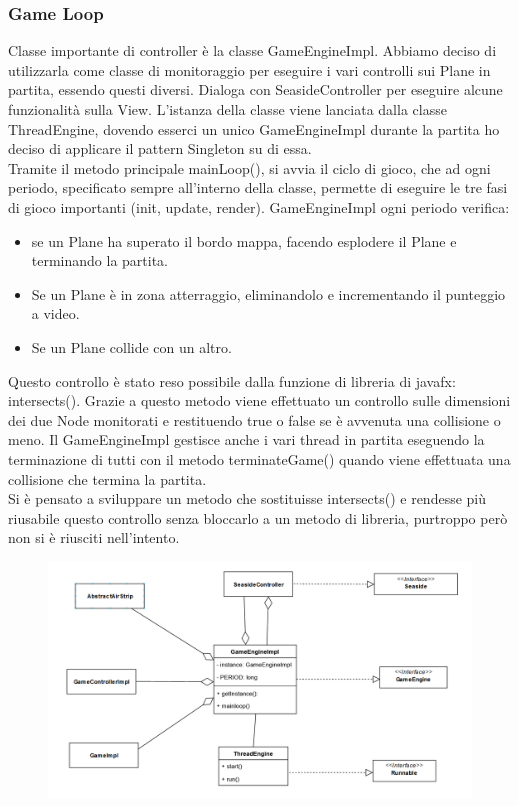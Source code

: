 \documentclass[a4paper,12pt]{report}
\begin{document}
\subsubsection{Game Loop}
Classe importante di controller è la classe GameEngineImpl.
Abbiamo deciso di utilizzarla come classe di monitoraggio per eseguire i vari controlli sui Plane in partita, essendo questi diversi.
Dialoga con SeasideController per eseguire alcune funzionalità sulla View.
L’istanza della classe viene lanciata dalla classe ThreadEngine, dovendo esserci un unico GameEngineImpl durante la partita ho deciso 
di applicare il pattern Singleton su di essa.
\\
Tramite il metodo principale mainLoop(), si avvia il ciclo di gioco, che ad ogni periodo, specificato sempre all’interno della classe, 
permette di eseguire le tre fasi di gioco importanti (init, update, render).
GameEngineImpl ogni periodo verifica:
\begin{itemize}
	\item se un Plane ha superato il bordo mappa, facendo esplodere il Plane e terminando la partita.
	\item Se un Plane è in zona atterraggio, eliminandolo e incrementando il punteggio a video.
	\item Se un Plane collide con un altro.
\end{itemize}

\noindent Questo controllo è stato reso possibile dalla funzione di libreria di javafx: intersects().
Grazie a questo metodo viene effettuato un controllo sulle dimensioni dei due Node monitorati e restituendo true o false se è avvenuta una 
collisione o meno.
Il GameEngineImpl gestisce anche i vari thread in partita eseguendo la terminazione di tutti con il metodo terminateGame() quando viene 
effettuata una collisione che termina la partita.
\\
Si è pensato a sviluppare un metodo che sostituisse intersects() e rendesse più riusabile questo controllo senza bloccarlo a un metodo di 
libreria, purtroppo però non si è riusciti nell’intento.
\begin{figure}[H]
    \begin{center}
        \centering
        \includegraphics[width=\textwidth]{img/Design/Rodilosso/GameEngine.png}
    \end{center}
    \label{img:game-engine}
\end{figure}
\end{document}
